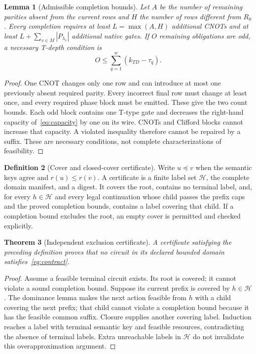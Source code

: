 \documentclass[11pt]{article}
\newtheorem{theorem}{Theorem}
\newtheorem{lemma}[theorem]{Lemma}
\theoremstyle{definition}\newtheorem{definition}[theorem]{Definition}
\newcommand{\calH}{\mathcal H}
\newcommand{\cov}{\preccurlyeq}
\begin{document}
\begin{lemma}[Admissible completion bounds]
Let $A$ be the number of remaining parities absent from the current rows and $H$ the number of rows different from $R_0$. Every completion requires at least $L=\max(A,H)$ additional CNOTs and at least $L+\sum_{v\in M}|P_{\lambda_v}|$ additional native gates. If $O$ remaining obligations are odd, a necessary T-depth condition is
\begin{equation}
O\le\sum_{q=1}^{w}(k_{T D}-\tau_q).
\label{eq:capacity}
\end{equation}
\end{lemma}
\begin{proof}
One CNOT changes only one row and can introduce at most one previously absent required parity. Every incorrect final row must change at least once, and every required phase block must be emitted. These give the two count bounds. Each odd block contains one T-type gate and decreases the right-hand capacity of~\eqref{eq:capacity} by one on its wire. CNOTs and Clifford blocks cannot increase that capacity. A violated inequality therefore cannot be repaired by a suffix. These are necessary conditions, not complete characterizations of feasibility.
\end{proof}

\begin{definition}[Cover and closed-cover certificate]
Write $u\cov v$ when the semantic keys agree and $r(u)\le r(v)$. A certificate is a finite label set $\calH$, the complete domain manifest, and a digest. It covers the root, contains no terminal label, and, for every $h\in\calH$ and every legal continuation whose child passes the prefix caps and the proved completion bounds, contains a label covering that child. If a completion bound excludes the root, an empty cover is permitted and checked explicitly.
\end{definition}

\begin{theorem}[Independent exclusion certificate]
A certificate satisfying the preceding definition proves that no circuit in its declared bounded domain satisfies~\eqref{eq:contract}.
\end{theorem}
\begin{proof}
Assume a feasible terminal circuit exists. Its root is covered; it cannot violate a sound completion bound. Suppose its current prefix is covered by $h\in\calH$. The dominance lemma makes the next action feasible from $h$ with a child covering the next prefix; that child cannot violate a completion bound because it has the feasible common suffix. Closure supplies another covering label. Induction reaches a label with terminal semantic key and feasible resources, contradicting the absence of terminal labels. Extra unreachable labels in $\calH$ do not invalidate this overapproximation argument.
\end{proof}
\end{document}
